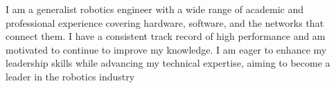 
\begin{cvparagraph}


I am a generalist robotics engineer with a wide range of academic and professional experience covering hardware, software, and the networks that connect them.
I have a consistent track record of high performance and am motivated to continue to improve my knowledge.
I am eager to enhance my leadership skills while advancing my technical expertise, aiming to become a leader in the robotics industry
\end{cvparagraph}
